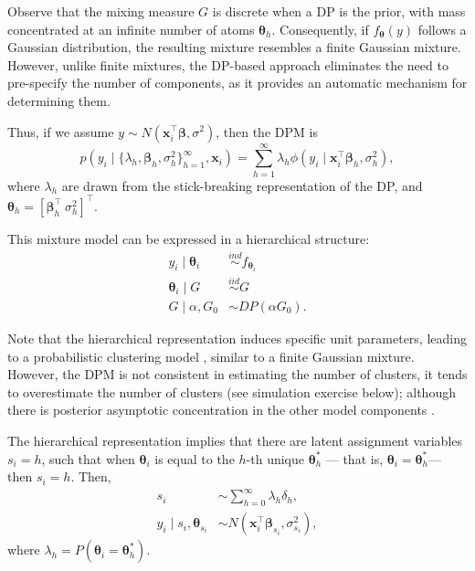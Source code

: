 Observe that the mixing measure $G$ is discrete when a DP is the prior, with mass concentrated at an infinite number of atoms $\boldsymbol{\theta}_h$. Consequently, if $f_{\boldsymbol{\theta}}(y)$ follows a Gaussian distribution, the resulting mixture resembles a finite Gaussian mixture. However, unlike finite mixtures, the DP-based approach eliminates the need to pre-specify the number of components, as it provides an automatic mechanism for determining them.

Thus, if we assume $y\sim N(\boldsymbol{x}_i^{\top}\boldsymbol{\beta},\sigma^2)$, then the DPM is 
\[
p(y_i \mid \{\lambda_h, \boldsymbol{\beta}_h, \sigma_h^2\}_{h=1}^{\infty}, \boldsymbol{x}_i) = 
\sum_{h=1}^{\infty} \lambda_h \phi(y_i \mid \boldsymbol{x}_i^{\top}\boldsymbol{\beta}_h, \sigma_h^2),
\]
where $\lambda_h$ are drawn from the stick-breaking representation of the DP, and $\boldsymbol{\theta}_h=[\boldsymbol{\beta}_h^{\top} \ \sigma^2_h]^{\top}$.

This mixture model can be expressed in a hierarchical structure:
\begin{align*}
	y_i\mid \boldsymbol{\theta}_i & \stackrel{ind}{\sim}f_{\boldsymbol{\theta}_i}\\
	\boldsymbol{\theta}_i \mid G & \stackrel{iid}{\sim} G\\
	G \mid \alpha,G_0 & \sim DP(\alpha G_0).
\end{align*}

Note that the hierarchical representation induces specific unit parameters, leading to a probabilistic clustering model \cite{Antoniak1974}, similar to a finite Gaussian mixture. However, the DPM is not consistent in estimating the number of clusters, it tends to overestimate the number of clusters (see simulation exercise below); although there is posterior asymptotic concentration in the other model components \cite{Miller2014}.

The hierarchical representation implies that there are latent assignment variables \( s_i = h \), such that when \( \boldsymbol{\theta}_i \) is equal to the \( h \)-th unique \( \boldsymbol{\theta}_h^* \) — that is, \( \boldsymbol{\theta}_i = \boldsymbol{\theta}_h^* \)— then \( s_i = h \). Then,
\begin{align*}
	s_i&\sim \sum_{h=0}^{\infty}\lambda_h\delta_h,\\
	y_i\mid s_i, \boldsymbol{\theta}_{s_i}&\sim N(\boldsymbol{x}_i^{\top}\boldsymbol{\beta}_{s_i},\sigma^2_{s_i}),
\end{align*} 
where $\lambda_h=P(\boldsymbol{\theta}_{i}=\boldsymbol{\theta}_{h}^*)$.

